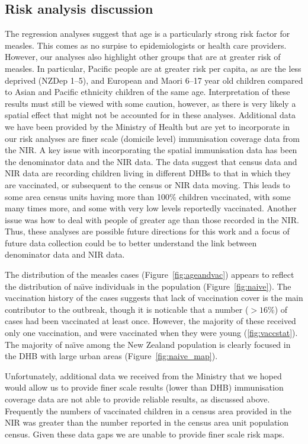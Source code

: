 \documentclass{article}
\begin{document}
\subsection*{Risk analysis discussion}

The regression analyses suggest that age is a particularly strong risk factor for measles. This comes as no surpise to epidemiologists or health care providers. However, our analyses also highlight other groups that are at greater risk of measles. In particular, Pacific people are at greater risk per capita, as are the less deprived (NZDep 1--5), and European and Maori 6--17 year old children compared to Asian and Pacific ethnicity children of the same age. Interpretation of these results must still be viewed with some caution, however, as there is very likely a spatial effect that might not be accounted for in these analyses. Additional data we have been provided by the Ministry of Health but are yet to incorporate in our risk analyses are finer scale (domicile level) immunisation coverage data from the NIR. A key issue with incorporating the spatial immunisation data has been the denominator data and the NIR data. The data suggest that census data and NIR data are recording children living in different DHBs to that in which they are vaccinated, or subsequent to the census or NIR data moving. This leads to some area census units having more than 100\% children vaccinated, with some many times more, and some with very low levels reportedly vaccinated. Another issue was how to deal with people of greater age than those recorded in the NIR. Thus, these analyses are possible future directions for this work and a focus of future data collection could be to better understand the link between denominator data and NIR data. 

The distribution of the measles cases (Figure~\autoref{fig:ageandvac}) appears to reflect the distribution of na\"{\i}ve individuals in the population (Figure~\autoref{fig:naive}). The vaccination history of the cases suggests that lack of vaccination cover is the main contributor to the outbreak, though it is noticable that a number ($>16\%$) of cases had been vaccinated at least once. However, the majority of these received only one vaccination, and were vaccinated when they were young (\autoref{fig:vaccstat}). The majority of na\"{\i}ve among the New Zealand population is clearly focused in the DHB with large urban areas (Figure~\autoref{fig:naive_map}). 

Unfortunately, additional data we received from the Ministry that we hoped would allow us to provide finer scale results (lower than DHB) immunisation coverage data are not able to provide reliable results, as discussed above. Frequently the numbers of vaccinated children in a census area provided in the NIR was greater than the number reported in the census area unit population census. Given these data gaps we are unable to provide finer scale risk maps.
\end{document}
